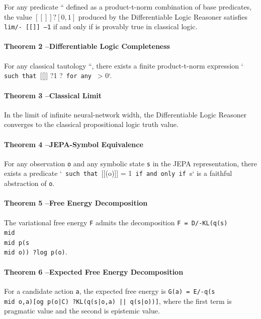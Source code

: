\documentclass[11pt]{article}
\begin{document}
For any predicate `` defined as a product-t-norm combination of base predicates,
the value $[[]] ?[0, 1]$ produced by the Differentiable Logic Reasoner
satisfies \texttt{lim/-{} [[]] --1} if and only if  is provably true in classical
logic.

\paragraph{Theorem 2 --Differentiable Logic Completeness}

For any classical tautology ``, there exists a finite product-t-norm expression
`\texttt{ such that }[[]] ?1 ?\texttt{ for any } > 0`.

\paragraph{Theorem 3 --Classical Limit}

In the limit of infinite neural-network width, the Differentiable Logic Reasoner
converges to the classical propositional logic truth value.

\paragraph{Theorem 4 --JEPA-Symbol Equivalence}

For any observation \texttt{o} and any symbolic state \texttt{s} in the JEPA representation,
there exists a predicate `\texttt{ such that }[[(o)]] = 1\texttt{ if and only if }s` is a
faithful abstraction of \texttt{o}.

\paragraph{Theorem 5 --Free Energy Decomposition}

The variational free energy \texttt{F} admits the decomposition
\texttt{F = D/-KL(q(s) \\mid \\mid  p(s\\mid o)) ?log p(o)}.

\paragraph{Theorem 6 --Expected Free Energy Decomposition}

For a candidate action \texttt{a}, the expected free energy is
\texttt{G(a) = E/-{q(s\\mid o,a)}[og p(o|C) ?KL(q(s|o,a) || q(s|o))]},
where the first term is pragmatic value and the second is epistemic value.
\end{document}
